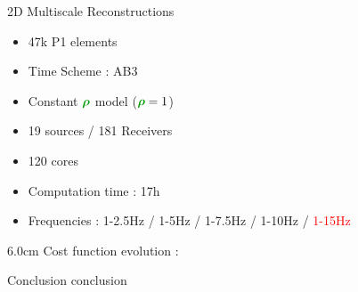 \begin{frame}[noframenumbering]{2D Multiscale Reconstructions}

  \begin{multicols}{2}
    \begin{itemize}
    \item 47k P1 elements
    \item Time Scheme : AB3
    \item Constant $\density$ model ($\density=1$)
    \item 19 sources / 181 Receivers
    \item 120 cores
    \item Computation time : 17h
    \item Frequencies : 1-2.5Hz / 1-5Hz / 1-7.5Hz / 1-10Hz / \textcolor{red}{1-15Hz}
    \end{itemize}
    \columnbreak

    \setlength{\plotwidth} {6.0cm}
    \setlength{\plotheight}{5cm}
    Cost function evolution :
    \begin{figure}
    \end{figure}
  \end{multicols}
\end{frame}



\begin{frame}{Conclusion}
conclusion
\end{frame}
